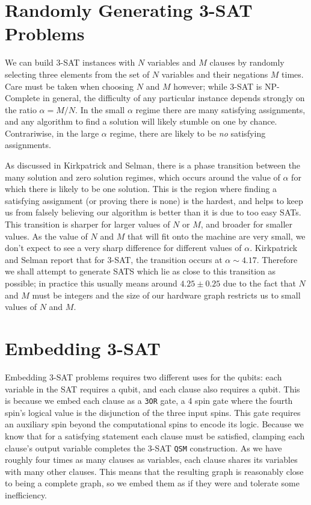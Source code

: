 \section{Randomly Generating 3-SAT Problems}
We can build 3-SAT instances with $N$ variables and $M$ clauses by randomly selecting three elements from the set of $N$ variables and their negations $M$ times.  Care must be taken when choosing $N$ and $M$ however; while 3-SAT is NP-Complete in general, the difficulty of any particular instance depends strongly on the ratio $\alpha = M/N$\cite{Kirkpatrick}.  In the small $\alpha$ regime there are many satisfying assignments, and any algorithm to find a solution will likely stumble on one by chance.  Contrariwise, in the large $\alpha$ regime, there are likely to be \emph{no} satisfying assignments.

As discussed in Kirkpatrick and Selman\cite{Kirkpatrick}, there is a phase transition between the many solution and zero solution regimes, which occurs around the value of $\alpha$ for which there is likely to be one solution.  This is the region where finding a satisfying assignment (or proving there is none) is the hardest, and helps to keep us from falsely believing our algorithm is better than it is due to too easy SATs.  This transition is sharper for larger values of $N$ or $M$, and broader for smaller values.  As the value of $N$ and $M$ that will fit onto the \machine machine are very small, we don't expect to see a very sharp difference for different values of $\alpha$.  Kirkpatrick and Selman report that for 3-SAT, the transition occurs at $\alpha \sim 4.17$.  Therefore we shall attempt to generate SATS which lie as close to this transition as possible; in practice this usually means around $4.25 \pm 0.25$ due to the fact that $N$ and $M$ must be integers and the size of our hardware graph restricts us to small values of $N$ and $M$.

\section{Embedding 3-SAT}
Embedding 3-SAT problems requires two different uses for the qubits: each variable in the SAT requires a qubit, and each clause also requires a qubit.  This is because we embed each clause as a \texttt{3OR} gate, a 4 spin gate where the fourth spin's logical value is the disjunction of the three input spins.  This gate requires an auxiliary spin beyond the computational spins to encode its logic.  Because we know that for a satisfying statement each clause must be satisfied, clamping each clause's output variable completes the 3-SAT \texttt{QSM} construction.  As we have roughly four times as many clauses as variables, each clause shares its variables with many other clauses.  This means that the resulting graph is reasonably close to being a complete graph, so we embed them as if they were and tolerate some inefficiency. 

